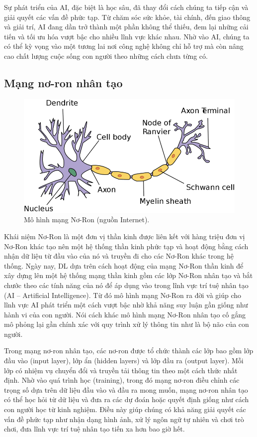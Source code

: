 Sự phát triển của AI, đặc biệt là học sâu, đã thay đổi cách chúng ta tiếp cận và giải quyết các vấn đề phức tạp. Từ chăm sóc sức khỏe, tài chính, đến giao thông và giải trí, AI đang dần trở thành một phần không thể thiếu, đem lại những cải tiến và tối ưu hóa vượt bậc cho nhiều lĩnh vực khác nhau. Nhờ vào AI, chúng ta có thể kỳ vọng vào một tương lai nơi công nghệ không chỉ hỗ trợ mà còn nâng cao chất lượng cuộc sống con người theo những cách chưa từng có.

\subsection{Mạng nơ-ron nhân tạo}

\begin{figure}[!h]
	\centering
	\includegraphics[width=120mm]{fig/notron.png}
        \captionsetup{justification=centering}
	\caption{Mô hình mạng Nơ-Ron (nguồn Internet).}
	\label{fig_Noron}
\end{figure}

Khái niệm Nơ-Ron là một đơn vị thần kinh được liên kết với hàng triệu đơn vị Nơ-Ron khác tạo nên một hệ thống thần kinh phức tạp và hoạt động bằng cách nhận dữ liệu từ đầu vào của nó và truyền đi cho các Nơ-Ron khác trong hệ thống. Ngày nay, DL dựa trên cách hoạt động của mạng Nơ-Ron thần kinh để xây dựng lên một hệ thống mạng thần kinh gồm các lớp Nơ-Ron nhân tạo và bắt chước theo các tính năng của nó để áp dụng vào trong lĩnh vực trí tuệ nhân tạo (AI – Artificial Intelligence). Từ đó mô hình mạng Nơ-Ron ra đời và giúp cho lĩnh vực AI phát triển một cách vượt bậc nhờ khả năng suy luận gần giống như hành vi của con người. Nói cách khác mô hình mạng Nơ-Ron nhân tạo cố gắng mô phỏng lại gần chính xác với quy trình xử lý thông tin như là bộ não của con người.

Trong mạng nơ-ron nhân tạo, các nơ-ron được tổ chức thành các lớp bao gồm lớp đầu vào (input layer), lớp ẩn (hidden layers) và lớp đầu ra (output layer). Mỗi lớp có nhiệm vụ chuyển đổi và truyền tải thông tin theo một cách thức nhất định. Nhờ vào quá trình học (training), trong đó mạng nơ-ron điều chỉnh các trọng số dựa trên dữ liệu đầu vào và đầu ra mong muốn, mạng nơ-ron nhân tạo có thể học hỏi từ dữ liệu và đưa ra các dự đoán hoặc quyết định giống như cách con người học từ kinh nghiệm. Điều này giúp chúng có khả năng giải quyết các vấn đề phức tạp như nhận dạng hình ảnh, xử lý ngôn ngữ tự nhiên và chơi trò chơi, đưa lĩnh vực trí tuệ nhân tạo tiến xa hơn bao giờ hết.


